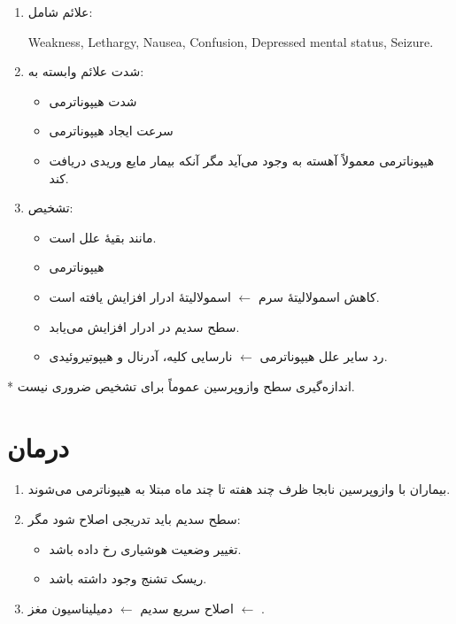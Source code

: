\documentclass[a4paper,12pt]{article}
\begin{document}
\begin{enumerate}[label=\arabic*.,start=9]
\item علائم شامل:
\begin{latin}
Weakness, Lethargy, Nausea, Confusion, Depressed mental status, Seizure.
\end{latin}
\item شدت علائم وابسته به:
\begin{itemize}
\item شدت هیپوناترمی
\item سرعت ایجاد هیپوناترمی
\item هیپوناترمی معمولاً آهسته به وجود می‌آید مگر آنکه بیمار مایع وریدی دریافت کند.
\end{itemize}
\item تشخیص:
\begin{itemize}
\item مانند بقیهٔ علل  است.
\item هیپوناترمی
\item کاهش اسمولالیتهٔ سرم $\leftarrow$ اسمولالیتهٔ ادرار افزایش یافته است.
\item سطح سدیم در ادرار افزایش می‌یابد.
\item رد سایر علل هیپوناترمی $\leftarrow$ نارسایی کلیه، آدرنال و هیپوتیروئیدی.
\end{itemize}
\end{enumerate}
* اندازه‌گیری سطح وازوپرسین عموماً برای تشخیص ضروری نیست.
\section*{درمان}
\begin{enumerate}[label=\arabic*.,start=12]
\item بیماران با وازوپرسین نابجا ظرف چند هفته تا چند ماه مبتلا به هیپوناترمی می‌شوند.
\item سطح سدیم باید تدریجی اصلاح شود مگر:
\begin{itemize}
\item تغییر وضعیت هوشیاری رخ داده باشد.
\item ریسک تشنج وجود داشته باشد.
\end{itemize}
\item اصلاح سریع سدیم $\leftarrow$ دمیلیناسیون مغز $\leftarrow$ .
\end{enumerate}
\end{document}
